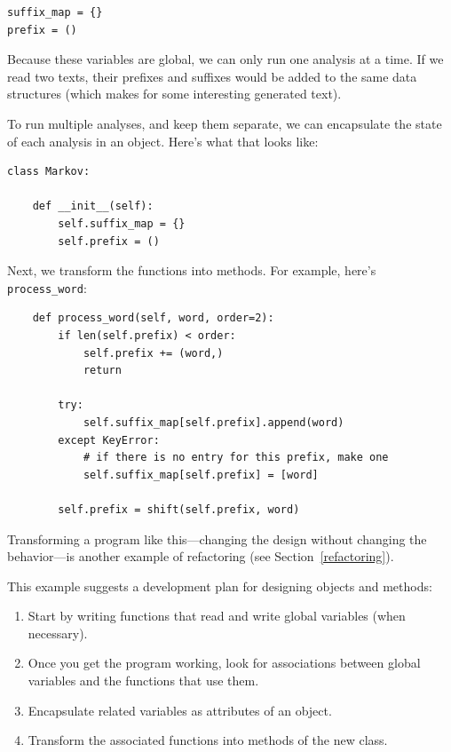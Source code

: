 \documentclass[10pt]{book}
\begin{document}
\begin{verbatim}
suffix_map = {}        
prefix = ()            
\end{verbatim}

Because these variables are global, we can only run one analysis at a
time.  If we read two texts, their prefixes and suffixes would be
added to the same data structures (which makes for some interesting
generated text).

To run multiple analyses, and keep them separate, we can encapsulate
the state of each analysis in an object.
Here's what that looks like:

\begin{verbatim}
class Markov:

    def __init__(self):
        self.suffix_map = {}
        self.prefix = ()    
\end{verbatim}

Next, we transform the functions into methods.  For example,
here's \verb"process_word":

\begin{verbatim}
    def process_word(self, word, order=2):
        if len(self.prefix) < order:
            self.prefix += (word,)
            return

        try:
            self.suffix_map[self.prefix].append(word)
        except KeyError:
            # if there is no entry for this prefix, make one
            self.suffix_map[self.prefix] = [word]

        self.prefix = shift(self.prefix, word)        
\end{verbatim}

Transforming a program like this---changing the design without
changing the behavior---is another example of refactoring
(see Section~\ref{refactoring}).

This example suggests a development plan for designing objects and
methods:

\begin{enumerate}

\item Start by writing functions that read and write global
variables (when necessary).

\item Once you get the program working, look for associations
between global variables and the functions that use them.

\item Encapsulate related variables as attributes of an object.

\item Transform the associated functions into methods of the new
class.

\end{enumerate}
\end{document}
